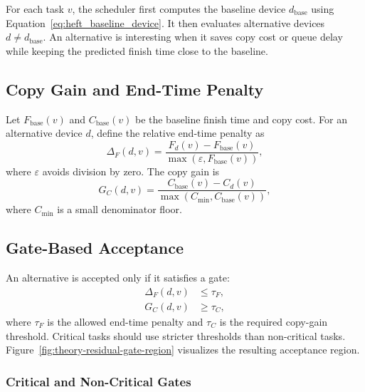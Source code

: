For each task $v$, the scheduler first computes the baseline device $d_{\mathrm{base}}$ using Equation~\eqref{eq:heft_baseline_device}. It then evaluates alternative devices $d \neq d_{\mathrm{base}}$. An alternative is interesting when it saves copy cost or queue delay while keeping the predicted finish time close to the baseline.

\subsection{Copy Gain and End-Time Penalty}
\label{subsec:copy_gain_end_penalty}

Let $F_{\mathrm{base}}(v)$ and $C_{\mathrm{base}}(v)$ be the baseline finish time and copy cost. For an alternative device $d$, define the relative end-time penalty as
\begin{equation}
\Delta_F(d,v) = \frac{F_d(v) - F_{\mathrm{base}}(v)}{\max(\varepsilon, F_{\mathrm{base}}(v))},
\label{eq:end_penalty}
\end{equation}
where $\varepsilon$ avoids division by zero. The copy gain is
\begin{equation}
G_C(d,v) = \frac{C_{\mathrm{base}}(v) - C_d(v)}{\max(C_{\min}, C_{\mathrm{base}}(v))},
\label{eq:copy_gain}
\end{equation}
where $C_{\min}$ is a small denominator floor.

\subsection{Gate-Based Acceptance}
\label{subsec:gate_based_acceptance}

An alternative is accepted only if it satisfies a gate:
\begin{align}
\Delta_F(d,v) &\leq \tau_F, \\
G_C(d,v) &\geq \tau_C,
\label{eq:residual_gate}
\end{align}
where $\tau_F$ is the allowed end-time penalty and $\tau_C$ is the required copy-gain threshold. Critical tasks should use stricter thresholds than non-critical tasks. Figure~\ref{fig:theory-residual-gate-region} visualizes the resulting acceptance region.

\figTheoryResidualGate

\subsubsection{Critical and Non-Critical Gates}
\label{subsubsec:critical_noncritical_gates}

